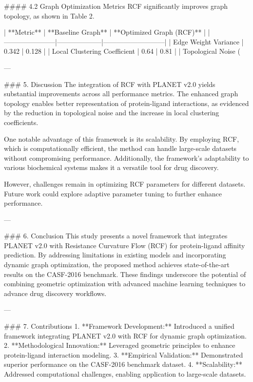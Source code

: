 #### 4.2 Graph Optimization Metrics  
RCF significantly improves graph topology, as shown in Table 2.  

| **Metric**           | **Baseline Graph** | **Optimized Graph (RCF)** |  
|-----------------------|--------------------|---------------------------|  
| Edge Weight Variance  | 0.342              | 0.128                     |  
| Local Clustering Coefficient | 0.64         | 0.81                      |  
| Topological Noise (%

---

### 5. Discussion  
The integration of RCF with PLANET v2.0 yields substantial improvements across all performance metrics. The enhanced graph topology enables better representation of protein-ligand interactions, as evidenced by the reduction in topological noise and the increase in local clustering coefficients.  

One notable advantage of this framework is its scalability. By employing RCF, which is computationally efficient, the method can handle large-scale datasets without compromising performance. Additionally, the framework's adaptability to various biochemical systems makes it a versatile tool for drug discovery.  

However, challenges remain in optimizing RCF parameters for different datasets. Future work could explore adaptive parameter tuning to further enhance performance.  

---

### 6. Conclusion  
This study presents a novel framework that integrates PLANET v2.0 with Resistance Curvature Flow (RCF) for protein-ligand affinity prediction. By addressing limitations in existing models and incorporating dynamic graph optimization, the proposed method achieves state-of-the-art results on the CASF-2016 benchmark. These findings underscore the potential of combining geometric optimization with advanced machine learning techniques to advance drug discovery workflows.  

---

### 7. Contributions  
1. **Framework Development:** Introduced a unified framework integrating PLANET v2.0 with RCF for dynamic graph optimization.  
2. **Methodological Innovation:** Leveraged geometric principles to enhance protein-ligand interaction modeling.  
3. **Empirical Validation:** Demonstrated superior performance on the CASF-2016 benchmark dataset.  
4. **Scalability:** Addressed computational challenges, enabling application to large-scale datasets.